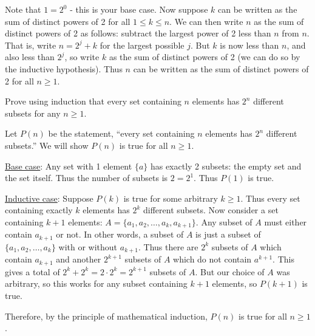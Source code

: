 \begin{questions}
	\begin{answer}
		Note that $1 = 2^0$ - this is your base case.  Now suppose $k$ can be written as the sum of distinct powers of 2 for all $1\le k \le n$.  We can then write $n$ as the sum of distinct powers of 2 as follows: subtract the largest power of 2 less than $n$ from $n$.  That is, write $n = 2^j + k$ for the largest possible $j$.  But $k$ is now less than $n$, and also less than $2^j$, so write $k$ as the sum of distinct powers of 2 (we can do so by the inductive hypothesis).  Thus $n$ can be written as the sum of distinct powers of 2 for all $n \ge 1$.
	\end{answer}
	
	

%

\question Prove using induction that every set containing $n$ elements has $2^n$ different subsets for any $n \ge 1$.

	\begin{answer}
		Let $P(n)$ be the statement, ``every set containing $n$ elements has $2^n$ different subsets.''  We will show $P(n)$ is true for all $n \ge 1$.
		
		\underline{Base case}: Any set with 1 element $\{a\}$ has exactly 2 subsets: the empty set and the set itself.  Thus the number of subsets is $2= 2^1$.  Thus $P(1)$ is true.
		
		\underline{Inductive case}: Suppose $P(k)$ is true for some arbitrary $k \ge 1$.  Thus every set containing exactly $k$ elements has $2^k$ different subsets.  Now consider a set containing $k+1$ elements: $A = \{a_1, a_2, \ldots, a_k, a_{k+1}\}$.  Any subset of $A$ must either contain $a_{k+1}$ or not.  In other words, a subset of $A$ is just a subset of $\{a_1, a_2,\ldots, a_k\}$ with or without $a_{k+1}$.  Thus there are $2^k$ subsets of $A$ which contain $a_{k+1}$ and another $2^{k+1}$ subsets of $A$ which do not contain $a^{k+1}$.  This gives a total of $2^k + 2^k = 2\cdot 2^k = 2^{k+1}$ subsets of $A$.  But our choice of $A$ was arbitrary, so this works for any subset containing $k+1$ elements, so $P(k+1)$ is true.
		
		Therefore, by the principle of mathematical induction, $P(n)$ is true for all $n \ge 1$.
	\end{answer}	
	
	
	
\end{questions}